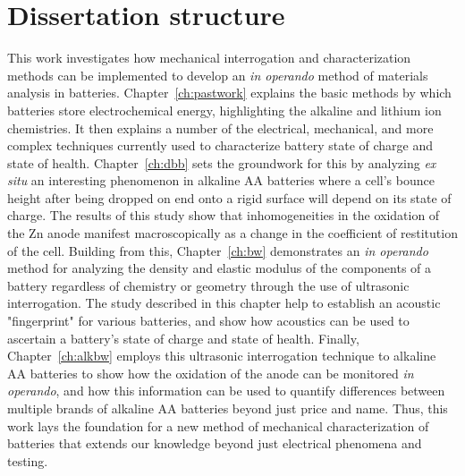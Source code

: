 \section{Dissertation structure}
\label{sec:intro:structure}

This work investigates how mechanical interrogation and characterization methods can be implemented to develop an \textit{in operando} method of materials analysis in batteries. Chapter~\ref{ch:pastwork} explains the basic methods by which batteries store electrochemical energy, highlighting the alkaline and lithium ion chemistries. It then explains a number of the electrical, mechanical, and more complex techniques currently used to characterize battery state of charge and state of health. Chapter~\ref{ch:dbb} sets the groundwork for this by analyzing \textit{ex situ} an interesting phenomenon in alkaline AA batteries where a cell's bounce height after being dropped on end onto a rigid surface will depend on its state of charge. The results of this study show that inhomogeneities in the oxidation of the Zn anode manifest macroscopically as a change in the coefficient of restitution of the cell. Building from this, Chapter~\ref{ch:bw} demonstrates an \textit{in operando} method for analyzing the density and elastic modulus of the components of a battery regardless of chemistry or geometry through the use of ultrasonic interrogation. The study described in this chapter help to establish an acoustic "fingerprint" for various batteries, and show how acoustics can be used to ascertain a battery's state of charge and state of health. Finally, Chapter~\ref{ch:alkbw} employs this ultrasonic interrogation technique to alkaline AA batteries to show how the oxidation of the anode can be monitored \textit{in operando}, and how this information can be used to quantify differences between multiple brands of alkaline AA batteries beyond just price and name. Thus, this work lays the foundation for a new method of mechanical characterization of batteries that extends our knowledge beyond just electrical phenomena and testing.   